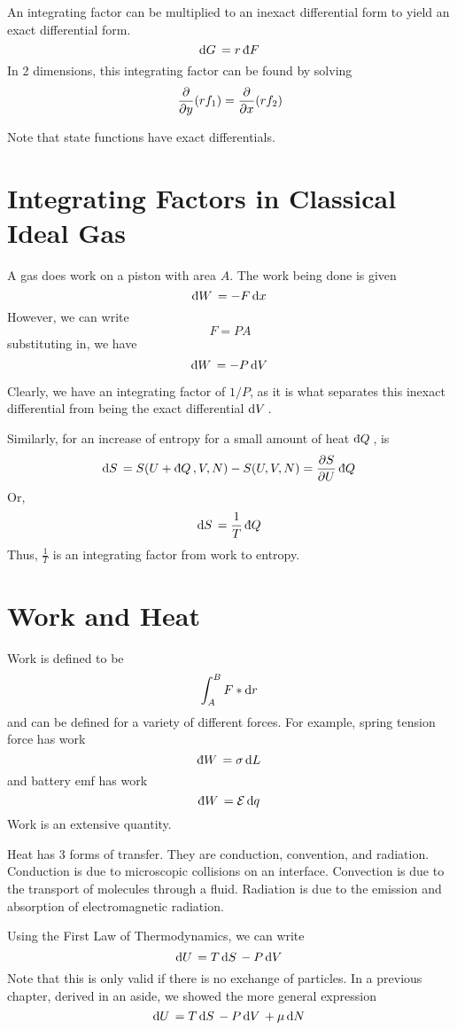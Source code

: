 An integrating factor can be multiplied to an inexact differential form to yield an exact differential form. 
\begin{equation}
	\d{G}=r\dbar{F}
\end{equation}
In 2 dimensions, this integrating factor can be found by solving
\[\frac{\partial }{\partial y}(rf_1)=\frac{\partial }{\partial x}(rf_2)\]

Note that state functions have exact differentials.

\section{Integrating Factors in Classical Ideal Gas}
A gas does work on a piston with area \(A\). The work being done is given 
\[\dbar{W}=-F\d{x}\]
However, we can write
\[F=PA\]
substituting in, we have
\begin{equation}
	\dbar{W}=-P\d{V}\label{eq9:pvwork}
\end{equation}

Clearly, we have an integrating factor of \(1/P\), as it is what separates this inexact differential from being the exact differential \(\d{V}\).

Similarly, for an increase of entropy for a small amount of heat \(\dbar{Q}\), is
\[\d{S}=S(U+\dbar{Q},V,N)-S(U,V,N)=\pder{S}{U}\dbar{Q}\]
Or,
\begin{equation}
	\d{S}=\frac{1}{T}\dbar{Q}
\end{equation}
Thus, \(\frac{1}{T}\) is an integrating factor from work to entropy.

\section{Work and Heat}
Work is defined to be 
\begin{equation}
	\int_A^B F*\d{r}
\end{equation}
and can be defined for a variety of different forces. For example, spring tension force has work
\[\dbar{W}=\sigma\d{L}\]
and battery emf has work
\[\dbar{W}=\mathcal{E}\d{q}\]
Work is an extensive quantity.

Heat has 3 forms of transfer. They are conduction, convention, and radiation. Conduction is due to microscopic collisions on an interface. Convection is due to the transport of molecules through a fluid. Radiation is due to the emission and absorption of electromagnetic radiation.

Using the First Law of Thermodynamics, we can write
\begin{equation}
	\d{U}=T\d{S}-P\d{V}
\end{equation}
Note that this is only valid if there is no exchange of particles. In a previous chapter, derived in an aside, we showed the more general expression
\begin{equation}
	\d{U}=T\d{S}-P\d{V}+\mu\d{N}\label{eq9:firstlaw}
\end{equation}

